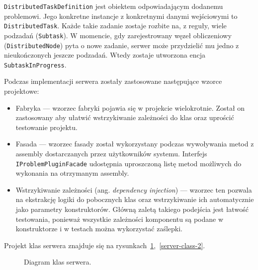 \documentclass[a4paper,11pt,twoside]{report}
\theoremstyle{definition}
\begin{document}
\texttt{DistributedTaskDefinition} jest obiektem odpowiadającym dodanemu problemowi. Jego konkretne instancje z konkretnymi danymi wejściowymi to \texttt{DistributedTask}. Każde takie zadanie zostaje rozbite na, z reguły, wiele podzadań (\texttt{Subtask}). W momencie, gdy zarejestrowany węzeł obliczeniowy (\texttt{DistributedNode}) pyta o nowe zadanie, serwer może przydzielić mu jedno z nieukończonych jeszcze podzadań. Wtedy zostaje utworzona encja \texttt{SubtaskInProgress}.


Podczas implementacji serwera zostały zastosowane następujące wzorce projektowe:
\begin{itemize}
    \item Fabryka --- wzorzec fabryki pojawia się w projekcie wielokrotnie. Został on zastosowany aby ułatwić wstrzykiwanie zależności do klas oraz uprościć testowanie projektu.
    \item Fasada --- wzorzec fasady został wykorzystany podczas wywoływania metod z assembly dostarczanych przez użytkowników systemu. Interfejs \texttt{IProblemPluginFacade} udostępnia  uproszczoną listę metod możliwych do wykonania na otrzymanym assembly.
    \item Wstrzykiwanie zależności (ang. \textit{dependency injection}) --- wzorzec ten pozwala na ekstrakcję logiki do pobocznych klas oraz wstrzykiwanie ich automatycznie jako parametry konstruktorów. Główną zaletą takiego podejścia jest łatwość testowania, ponieważ wszystkie zależności komponentu są podane w konstruktorze i w testach można wykorzystać zaślepki.
\end{itemize}

Projekt klas serwera znajduje się na rysunkach~\ref{server-class-1},~\ref{server-class-2}.

\begin{figure} 
    \caption{Diagram klas serwera.}
    \label{server-class-1}
\end{figure}
\end{document}
